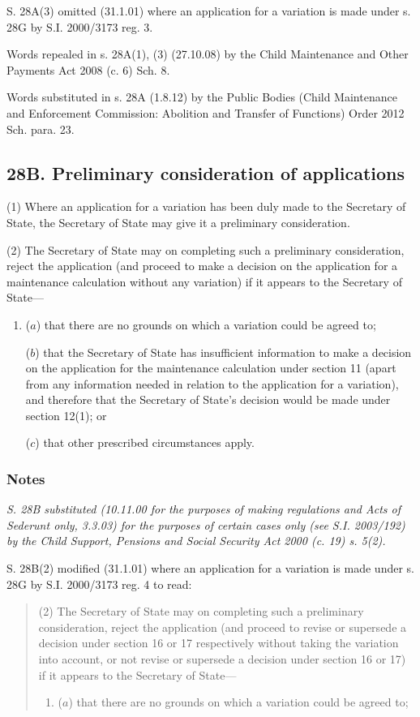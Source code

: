 \documentclass[a4paper]{article}
\newcommand\amendment[1]{\subsubsection*{Notes}{\itshape\frenchspacing\footnotesize #1 \par}}
\begin{document}
{{S. 28A(3) omitted (31.1.01) where an application for a variation is made under s. 28G by S.I. 2000/3173 reg. 3.

Words repealed in s. 28A(1), (3) (27.10.08) by the Child Maintenance and Other Payments Act 2008 (c. 6) Sch. 8.

Words substituted in s. 28A (1.8.12) by the Public Bodies (Child Maintenance and Enforcement Commission: Abolition and Transfer of Functions) Order 2012 Sch. para. 23.
}

\subsection{28B. Preliminary consideration of applications}

(1) Where an application for a variation has been duly made to the Secretary of State, the Secretary of State may give it a preliminary consideration.

(2) The Secretary of State may on completing such a preliminary consideration, reject the application (and proceed to make a decision on the application for a maintenance calculation without any variation) if it appears to the Secretary of State---
\begin{enumerate}\item[]
($a$) that there are no grounds on which a variation could be agreed to;

($b$) that the Secretary of State has insufficient information to make a decision on the application for the maintenance calculation under section 11 (apart from any information needed in relation to the application for a variation), and therefore that the Secretary of State's decision would be made under section 12(1); or

($c$) that other prescribed circumstances apply.
\end{enumerate}

\amendment{
S. 28B substituted (10.11.00 for the purposes of making regulations and Acts of Sederunt only, 3.3.03) for the purposes of certain cases only (see S.I. 2003/192) by the Child Support, Pensions and Social Security Act 2000 (c. 19) s. 5(2).

S. 28B(2) modified (31.1.01) where an application for a variation is made under s. 28G by S.I. 2000/3173 reg. 4 to read:
\begin{quotation}
(2) The Secretary of State may on completing such a preliminary consideration, reject the application (and proceed to revise or supersede a decision under section 16 or 17 respectively without taking the variation into account, or not revise or supersede a decision under section 16 or 17) if it appears to the Secretary of State---
\begin{enumerate}\item[]
($a$) that there are no grounds on which a variation could be agreed to;


\end{enumerate}
\end{quotation}}}
\end{document}
